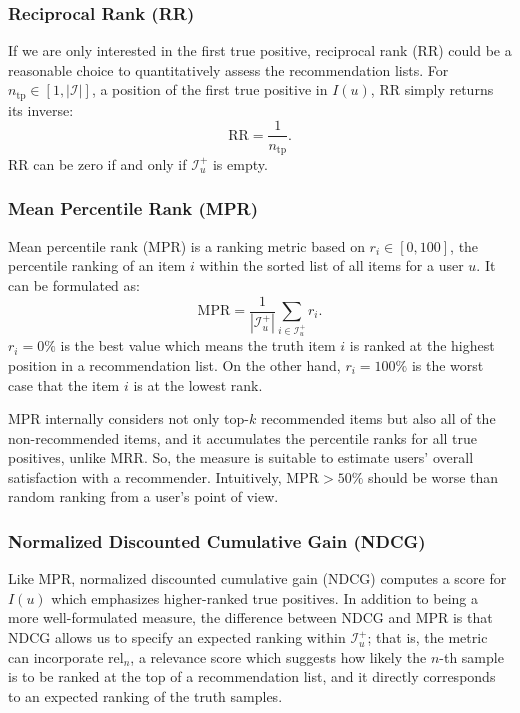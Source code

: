\subsubsection{Reciprocal Rank (RR)}

If we are only interested in the first true positive, reciprocal rank (RR) could be a reasonable choice to quantitatively assess the recommendation lists. For $n_{\mathrm{tp}} \in \left[ 1, |\mathcal{I}| \right]$, a position of the first true positive in $I(u)$, RR simply returns its inverse:
\begin{equation*}
  \mathrm{RR} = \frac{1}{n_{\mathrm{tp}}}.
\end{equation*}
RR can be zero if and only if $\mathcal{I}^+_u$ is empty.

\subsubsection{Mean Percentile Rank (MPR)}
Mean percentile rank (MPR) is a ranking metric based on $r_{i} \in [0, 100]$, the percentile ranking of an item $i$ within the sorted list of all items for a user $u$. It can be formulated as:
\begin{equation*}
\mathrm{MPR} = \frac{1}{|\mathcal{I}^+_u|} \sum_{i \in \mathcal{I}^+_u} r_{i}.
\end{equation*}
$r_{i} = 0\%$ is the best value which means the truth item $i$ is ranked at the highest position in a recommendation list. On the other hand, $r_{i} = 100\%$ is the worst case that the item $i$ is at the lowest rank.

MPR internally considers not only top-$k$ recommended items but also all of the non-recommended items, and it accumulates the percentile ranks for all true positives, unlike MRR. So, the measure is suitable to estimate users' overall satisfaction with a recommender. Intuitively, $\mathrm{MPR} > 50\%$ should be worse than random ranking from a user's point of view.

\subsubsection{Normalized Discounted Cumulative Gain (NDCG)}

Like MPR, normalized discounted cumulative gain (NDCG) computes a score for $I(u)$ which emphasizes higher-ranked true positives. In addition to being a more well-formulated measure, the difference between NDCG and MPR is that NDCG allows us to specify an expected ranking within $\mathcal{I}^+_u$; that is, the metric can incorporate $\mathrm{rel}_n$, a relevance score which suggests how likely the $n$-th sample is to be ranked at the top of a recommendation list, and it directly corresponds to an expected ranking of the truth samples.

